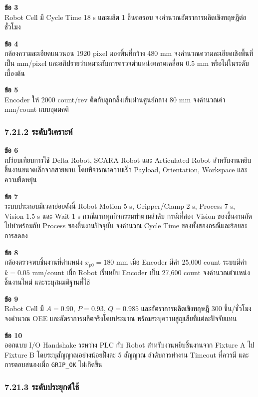 \textbf{ข้อ 3}\\
Robot Cell มี Cycle Time 18 s และผลิต 1 ชิ้นต่อรอบ จงคำนวณอัตราการผลิตเชิงทฤษฎีต่อชั่วโมง

\textbf{ข้อ 4}\\
กล้องความละเอียดแนวนอน 1920 pixel มองพื้นที่กว้าง 480 mm จงคำนวณความละเอียดเชิงพื้นที่เป็น mm/pixel และอภิปรายว่าเหมาะกับการตรวจตำแหน่งคลาดเคลื่อน 0.5 mm หรือไม่ในระดับเบื้องต้น

\textbf{ข้อ 5}\\
Encoder ให้ 2000 count/rev ติดกับลูกกลิ้งเส้นผ่านศูนย์กลาง 80 mm จงคำนวณค่า mm/count แบบอุดมคติ

\subsubsection{7.21.2 ระดับวิเคราะห์}

\textbf{ข้อ 6}\\
เปรียบเทียบการใช้ Delta Robot, SCARA Robot และ Articulated Robot สำหรับงานหยิบชิ้นงานขนาดเล็กจากสายพาน โดยพิจารณาความเร็ว Payload, Orientation, Workspace และความยืดหยุ่น

\textbf{ข้อ 7}\\
ระบบประกอบมีเวลาย่อยดังนี้ Robot Motion 5 s, Gripper/Clamp 2 s, Process 7 s, Vision 1.5 s และ Wait 1 s กรณีแรกทุกกิจกรรมทำตามลำดับ กรณีที่สอง Vision ของชิ้นงานถัดไปทำพร้อมกับ Process ของชิ้นงานปัจจุบัน จงคำนวณ Cycle Time ของทั้งสองกรณีและร้อยละการลดลง

\textbf{ข้อ 8}\\
กล้องตรวจพบชิ้นงานที่ตำแหน่ง $x_{p0}=180$ mm เมื่อ Encoder มีค่า 25,000 count ระบบมีค่า $k=0.05$ mm/count เมื่อ Robot เริ่มหยิบ Encoder เป็น 27,600 count จงคำนวณตำแหน่งชิ้นงานใหม่ และระบุสมมติฐานที่ใช้

\textbf{ข้อ 9}\\
Robot Cell มี $A=0.90$, $P=0.93$, $Q=0.985$ และอัตราการผลิตเชิงทฤษฎี 300 ชิ้น/ชั่วโมง จงคำนวณ OEE และอัตราการผลิตจริงโดยประมาณ พร้อมระบุความสูญเสียที่แต่ละปัจจัยแทน

\textbf{ข้อ 10}\\
ออกแบบ I/O Handshake ระหว่าง PLC กับ Robot สำหรับงานหยิบชิ้นงานจาก Fixture A ไป Fixture B โดยระบุสัญญาณอย่างน้อยฝั่งละ 5 สัญญาณ ลำดับการทำงาน Timeout ที่ควรมี และการตอบสนองเมื่อ \texttt{GRIP\_OK} ไม่เกิดขึ้น

\subsubsection{7.21.3 ระดับประยุกต์ใช้}

